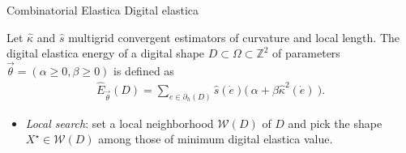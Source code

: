 \begin{frame}
	{Combinatorial Elastica}	
	{Digital elastica}
%	
		\begin{definition}
		Let $\hat{\kappa}$ and $\hat{s}$ multigrid convergent estimators of curvature and local length. The digital elastica energy of a digital shape $D \subset \Omega \subset \mathbb{Z}^2$ of parameters $\vec{\theta} = (\alpha \geq 0, \beta \geq 0)$ is defined as
%		
		\begin{align*}
			\hat{E}_{\vec{\theta}}(D) = \sum_{\dot{e} \in \partial_h(D)}{\hat{s}(\dot{e}) \Big(\: \alpha + \beta \hat{\kappa}^2(\dot{e}) \: \Big). }
		\end{align*}
	\end{definition}
%	
	\begin{itemize}
		\item<2->{\emph{Local search}: set a local neighborhood $\mathcal{W}(D)$ of $D$ and pick the shape $X^{\star} \in \mathcal{W}(D)$ among those of minimum digital elastica value.}
	\end{itemize}
\end{frame}
%
%
%
%
% 
%
%
%
